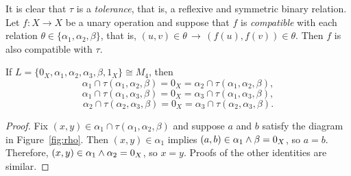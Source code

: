 It is clear that $\tau$ is a \emph{tolerance}, that is, a reflexive and symmetric binary relation.
Let $f: X\to X$ be a unary operation and suppose that $f$ is \emph{compatible} with each
relation $\theta \in \{\alpha_1, \alpha_2, \beta\}$, that is, 
$(u,v)\in \theta \, \longrightarrow \, (f(u), f(v))\in \theta$.  Then $f$ is also
compatible with $\tau$. %

\begin{fact} If 
$L = \{0_X, \alpha_1, \alpha_2, \alpha_3, \beta, 1_X\} \cong  M_4$,
then
  \[
\alpha_1 \cap \tau(\alpha_1, \alpha_2, \beta)
= 0_X =  \alpha_2 \cap \tau(\alpha_1, \alpha_2, \beta),
\]
\[
\alpha_1 \cap \tau(\alpha_1, \alpha_3, \beta)
= 0_X =  \alpha_3 \cap \tau(\alpha_1, \alpha_3, \beta),
\]
\[
\alpha_2 \cap \tau(\alpha_2, \alpha_3, \beta)
 = 0_X = \alpha_3 \cap \tau(\alpha_2, \alpha_3, \beta).
\]
\end{fact}
\begin{proof}
  Fix $(x,y) \in  \alpha_1 \cap \tau(\alpha_1, \alpha_2, \beta)$ and suppose 
  $a$ and $b$ satisfy the diagram in Figure~\ref{fig:rho}.  Then 
  $(x,y) \in \alpha_1$ implies $(a, b)\in \alpha_1 \wedge \beta = 0_X$, so 
  $a = b$.  Therefore, $(x,y) \in \alpha_1 \wedge \alpha_2 = 0_X$, so $x = y$.
  Proofs of the other identities are similar.
\end{proof}

